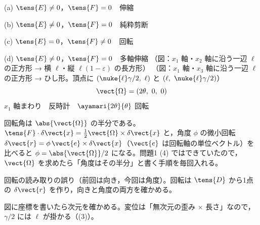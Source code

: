 (a) $\tens{E}\neq0$，$\tens{F}=0$　伸縮

(b) $\tens{E}\neq0$，$\tens{F}=0$　純粋剪断

(c) $\tens{E}=0$，$\tens{F}\neq0$　回転

(d) $\tens{E}\neq0$，$\tens{F}=0$　多軸伸縮
（図：$x_{1}$ 軸・$x_{2}$ 軸に沿う一辺 $\ell$ の正方形 → 横 $\ell$・縦 $\ell(1-\varepsilon)$ の長方形）
（図：$x_{1}$ 軸・$x_{3}$ 軸に沿う一辺 $\ell$ の正方形 → ひし形。頂点に $(\nuke{\ell}\gamma/2,\ \ell)$ と $(\ell,\ \nuke{\ell}\gamma/2)$）
\[ \vect{\Omega}=(2\theta,\ 0,\ 0) \]
$x_{1}$ 軸まわり　反時計　$\ayamari{2\theta}{\theta}$ 回転
\item 回転角は $\abs{\vect{\Omega}}$ の半分である。$\tens{F}\cdot\delta\vect{x}=\frac{1}{2}\vect{\Omega}\times\delta\vect{x}$ と，角度 $\phi$ の微小回転 $\delta\vect{r}=\phi\,\vect{e}\times\delta\vect{x}$（$\vect{e}$ は回転軸の単位ベクトル）を比べると $\phi=\abs{\vect{\Omega}}/2$ になる。問題1 (4) ではできていたので，$\vect{\Omega}$ を求めたら「角度はその半分」と書く手順を毎回入れる。
\item {} 回転の読み取りの誤り（前回は向き，今回は角度）。回転は $\tens{D}$ から1点の $\delta\vect{r}$ を作り，向きと角度の両方を確かめる。
\item 図に座標を書いたら次元を確かめる。変位は「無次元の歪み $\times$ 長さ」なので，$\gamma/2$ には $\ell$ が掛かる（(3)）。
